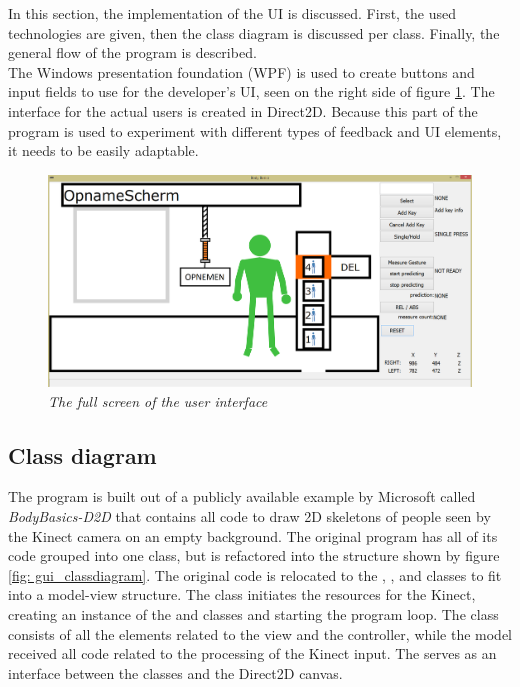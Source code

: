 In this section, the implementation of the UI is discussed. First, the used technologies are given, then the class diagram is discussed per class. Finally, the general flow of the program is described.\\

The Windows presentation foundation (WPF) is used to create buttons and input fields to use for the developer's UI, seen on the right side of figure \ref{real implementation}. The interface for the actual users is created in Direct2D. Because this part of the program is used to experiment with different types of feedback and UI elements, it needs to be easily adaptable.

\begin{figure}[H]
	\begin{center}
		\includegraphics[width=14cm]{figures/1_full_screen_with_user.png}
		\caption{\emph{The full screen of the user interface}}
		\label{real implementation}
	\end{center}
\end{figure}

\subsection{Class diagram}

The program is built out of a publicly available example by Microsoft called \emph{BodyBasics-D2D} that contains all code to draw 2D skeletons of people seen by the Kinect camera on an empty background. The original program has all of its code grouped into one class, but is refactored into the structure shown by figure \ref{fig: gui_classdiagram}. The original code is relocated to the , ,  and  classes to fit into a model-view structure. The  class initiates the resources for the Kinect, creating an instance of the  and  classes and starting the program loop. The  class consists of all the elements related to the view and the controller, while the model received all code related to the processing of the Kinect input. The  serves as an interface between the  classes and the Direct2D canvas.\\

